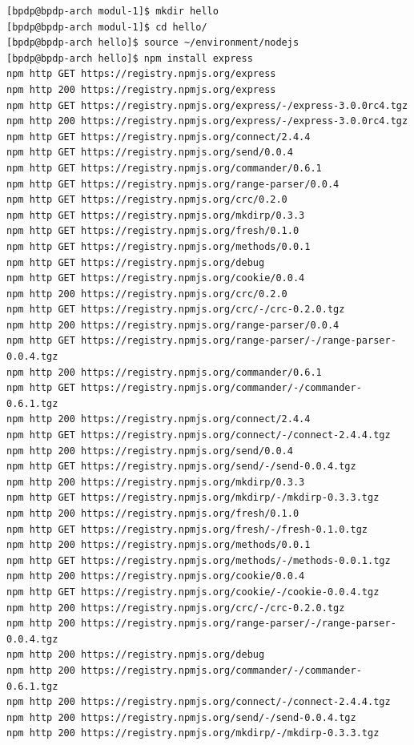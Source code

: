 \lstset{language=bash,caption=Instalasi ExpressJS menggunakan npm}
\begin{lstlisting}
[bpdp@bpdp-arch modul-1]$ mkdir hello 
[bpdp@bpdp-arch modul-1]$ cd hello/ 
[bpdp@bpdp-arch hello]$ source ~/environment/nodejs 
[bpdp@bpdp-arch hello]$ npm install express 
npm http GET https://registry.npmjs.org/express 
npm http 200 https://registry.npmjs.org/express 
npm http GET https://registry.npmjs.org/express/-/express-3.0.0rc4.tgz 
npm http 200 https://registry.npmjs.org/express/-/express-3.0.0rc4.tgz 
npm http GET https://registry.npmjs.org/connect/2.4.4 
npm http GET https://registry.npmjs.org/send/0.0.4 
npm http GET https://registry.npmjs.org/commander/0.6.1 
npm http GET https://registry.npmjs.org/range-parser/0.0.4 
npm http GET https://registry.npmjs.org/crc/0.2.0 
npm http GET https://registry.npmjs.org/mkdirp/0.3.3 
npm http GET https://registry.npmjs.org/fresh/0.1.0 
npm http GET https://registry.npmjs.org/methods/0.0.1 
npm http GET https://registry.npmjs.org/debug 
npm http GET https://registry.npmjs.org/cookie/0.0.4 
npm http 200 https://registry.npmjs.org/crc/0.2.0 
npm http GET https://registry.npmjs.org/crc/-/crc-0.2.0.tgz 
npm http 200 https://registry.npmjs.org/range-parser/0.0.4 
npm http GET https://registry.npmjs.org/range-parser/-/range-parser-0.0.4.tgz 
npm http 200 https://registry.npmjs.org/commander/0.6.1 
npm http GET https://registry.npmjs.org/commander/-/commander-0.6.1.tgz 
npm http 200 https://registry.npmjs.org/connect/2.4.4 
npm http GET https://registry.npmjs.org/connect/-/connect-2.4.4.tgz 
npm http 200 https://registry.npmjs.org/send/0.0.4 
npm http GET https://registry.npmjs.org/send/-/send-0.0.4.tgz 
npm http 200 https://registry.npmjs.org/mkdirp/0.3.3 
npm http GET https://registry.npmjs.org/mkdirp/-/mkdirp-0.3.3.tgz 
npm http 200 https://registry.npmjs.org/fresh/0.1.0 
npm http GET https://registry.npmjs.org/fresh/-/fresh-0.1.0.tgz 
npm http 200 https://registry.npmjs.org/methods/0.0.1 
npm http GET https://registry.npmjs.org/methods/-/methods-0.0.1.tgz 
npm http 200 https://registry.npmjs.org/cookie/0.0.4 
npm http GET https://registry.npmjs.org/cookie/-/cookie-0.0.4.tgz 
npm http 200 https://registry.npmjs.org/crc/-/crc-0.2.0.tgz 
npm http 200 https://registry.npmjs.org/range-parser/-/range-parser-0.0.4.tgz 
npm http 200 https://registry.npmjs.org/debug 
npm http 200 https://registry.npmjs.org/commander/-/commander-0.6.1.tgz 
npm http 200 https://registry.npmjs.org/connect/-/connect-2.4.4.tgz 
npm http 200 https://registry.npmjs.org/send/-/send-0.0.4.tgz 
npm http 200 https://registry.npmjs.org/mkdirp/-/mkdirp-0.3.3.tgz 

\end{lstlisting}
